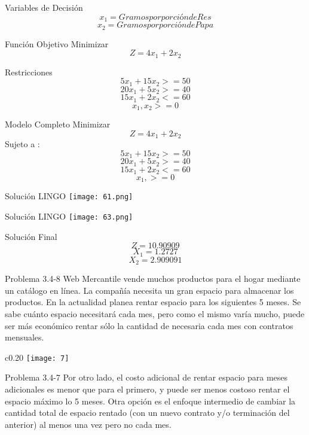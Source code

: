 \documentclass{beamer}
\begin{document}
\begin{frame}[fragile]{Variables de Decisión}
\[x_{1} = Gramos por porción de Res\]
\[x_{2} = Gramos por porción de Papa\]

\end{frame}

\begin{frame}[fragile]{Función Objetivo}
Minimizar\\
\[Z = 4x_{1} + 2x_{2}\]

\end{frame}

\begin{frame}[fragile]{Restricciones}
\[5x_{1} + 15x_{2} >= 50\]
\[20x_{1} +5x_{2} >= 40\]
\[15x_{1} + 2x_{2} <=60\]
\[x_{1} , x_{2} >= 0\]

\end{frame}

\begin{frame}[fragile]{Modelo Completo}
Minimizar\\
\[Z = 4x_{1} + 2x_{2}\]
Sujeto a :\\
\[5x_{1} + 15x_{2} >= 50\]
\[20x_{1} +5x_{2} >= 40\]
\[15x_{1} + 2x_{2} <= 60\]
\[x_{1}, >= 0\]
\end{frame}

\begin{frame}[fragile]{Solución LINGO}
    \texttt{[image: 61.png]}
\end{frame}
\begin{frame}[fragile]{Solución LINGO}
    \texttt{[image: 63.png]}
\end{frame}

\begin{frame}[fragile]{Solución Final}
\[Z = 10.90909\]
\[X_{1} = 1.2727\]
\[X_{2} = 2.909091\]
\end{frame}

\begin{frame}[t,fragile]{Problema 3.4-8 }
Web Mercantile vende muchos productos para el hogar mediante un catálogo en línea. La compañía  necesita un gran espacio para almacenar los productos. En la actualidad planea rentar espacio para los siguientes 5 meses. Se sabe cuánto espacio necesitará cada mes, pero como el mismo varía mucho, puede ser más económico rentar sólo la cantidad  de necesaria cada mes con contratos mensuales.
\begin{wrapfigure}{c}{0.20\textwidth}
    \centering
    \texttt{[image: 7]}
\end{wrapfigure}
\end{frame}
\begin{frame}[t,fragile]{Problema 3.4-7}
Por otro lado, el costo adicional de rentar espacio para meses adicionales es menor que para el primero, y puede ser menos costoso rentar el espacio máximo lo 5 meses. Otra opción es el enfoque intermedio de cambiar la cantidad total de  espacio rentado (con un nuevo contrato y/o terminación del anterior) al menos una vez pero no cada mes.
\end{frame}
\end{document}
